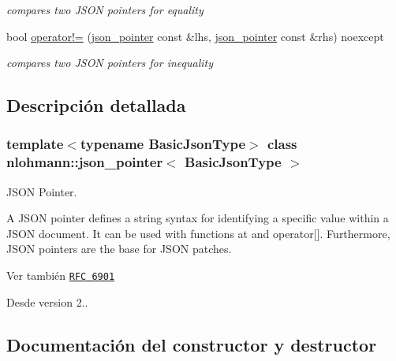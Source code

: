 \begin{DoxyCompactItemize}
\begin{DoxyCompactList}\small\item\em compares two J\+S\+ON pointers for equality \end{DoxyCompactList}\item 
bool \mbox{\hyperlink{classnlohmann_1_1json__pointer_a6779edcf28e6f018a3bbb29c0b4b5e1e}{operator!=}} (\mbox{\hyperlink{classnlohmann_1_1json__pointer}{json\+\_\+pointer}} const \&lhs, \mbox{\hyperlink{classnlohmann_1_1json__pointer}{json\+\_\+pointer}} const \&rhs) noexcept
\begin{DoxyCompactList}\small\item\em compares two J\+S\+ON pointers for inequality \end{DoxyCompactList}\end{DoxyCompactItemize}


\subsection{Descripción detallada}
\subsubsection*{template$<$typename Basic\+Json\+Type$>$\newline
class nlohmann\+::json\+\_\+pointer$<$ Basic\+Json\+Type $>$}

J\+S\+ON Pointer. 

A J\+S\+ON pointer defines a string syntax for identifying a specific value within a J\+S\+ON document. It can be used with functions {\ttfamily at} and {\ttfamily operator\mbox{[}\mbox{]}}. Furthermore, J\+S\+ON pointers are the base for J\+S\+ON patches.

\begin{DoxySeeAlso}{Ver también}
\href{https://tools.ietf.org/html/rfc6901}{\tt R\+FC 6901}
\end{DoxySeeAlso}
\begin{DoxySince}{Desde}
version 2.. 
\end{DoxySince}


\subsection{Documentación del constructor y destructor}
\mbox{\label{classnlohmann_1_1json__pointer_a7f32d7c62841f0c4a6784cf741a6e4f8}} 
